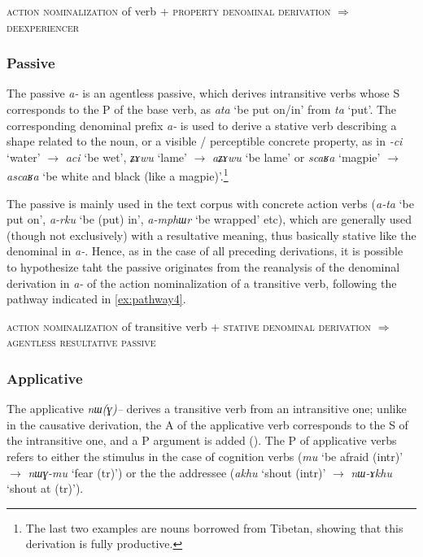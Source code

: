 \documentclass[oneside,a4paper,11pt]{article}
\newcommand{\ipa}[1]{\mbox{\phon\textit{#1}}} %
\begin{document}
\begin{exe}
\ex \label{ex:pathway3}
\glt \textsc{action nominalization} of verb + \textsc{property denominal derivation} $\Rightarrow$ \textsc{deexperiencer}
\end{exe}
\subsubsection{Passive} \label{sec:passive}
The passive \ipa{a-} is an agentless passive, which derives intransitive verbs whose S corresponds to the P of the base verb, as \ipa{ata}  `be put on/in' from \ipa{ta} `put'. The corresponding denominal prefix \ipa{a-} is used to derive a stative verb describing a shape related to the noun, or a visible / perceptible concrete property, as in \ipa{-ci} `water' $\rightarrow$  \ipa{aci} `be wet',  \ipa{ʑɤwu} `lame' $\rightarrow$  \ipa{aʑɤwu} `be lame' 
or \ipa{scaʁa} `magpie' $\rightarrow$  \ipa{ascaʁa} `be white and black (like a magpie)'.\footnote{The last two examples are nouns borrowed from Tibetan, showing that this derivation is fully productive.} 

The passive is mainly used in the text corpus with concrete action verbs (\ipa{a-ta} `be put on', \ipa{a-rku} `be (put) in', \ipa{a-mphɯr} `be wrapped' etc),  which are generally used (though not exclusively) with a resultative meaning, thus basically stative like the denominal in \ipa{a-}. Hence, as in the case of all preceding derivations, it is possible to hypothesize taht the passive originates from the reanalysis of the denominal derivation in \ipa{a-} of  the action nominalization of a transitive verb, following the pathway indicated in \ref{ex:pathway4}.


\begin{exe}
\ex \label{ex:pathway4}
\glt \textsc{action nominalization} of transitive verb + \textsc{stative denominal derivation} $\Rightarrow$ \textsc{agentless resultative passive}
\end{exe}

\subsubsection{Applicative} \label{sec:appl}
The applicative \ipa{nɯ(ɣ)--} derives a transitive verb from an intransitive one; unlike in the causative derivation, the A of the applicative verb corresponds to the S of the intransitive one, and a P argument is added (\citealt{jacques13tropative}). The P of applicative verbs refers to either the stimulus in the case of cognition verbs (\ipa{mu} `be afraid (intr)' $\rightarrow$ \ipa{nɯɣ-mu} `fear (tr)') or the the addressee (\ipa{akhu} `shout (intr)'  $\rightarrow$ \ipa{nɯ-ɤkhu} `shout at (tr)'). 
\end{document}
